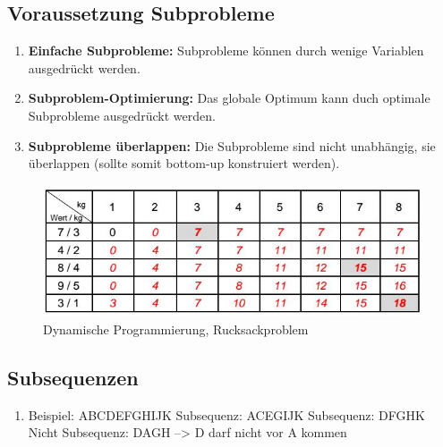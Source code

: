 \subsection{Voraussetzung Subprobleme}
\begin{enumerate}
	\item \textbf{Einfache Subprobleme:} Subprobleme können durch wenige Variablen ausgedrückt werden.
	\item \textbf{Subproblem-Optimierung:} Das globale Optimum kann duch optimale Subprobleme ausgedrückt werden.
	\item \textbf{Subprobleme überlappen:} Die Subprobleme sind nicht unabhängig, sie überlappen (sollte somit bottom-up konstruiert werden).
\end{enumerate}


\newpage

\begin{figure}[h]
\centering
\includegraphics[width=0.8\linewidth]{images/dynamische_prog}
\caption{Dynamische Programmierung, Rucksackproblem}
\label{fig:dynamischeprog}
\end{figure}

\subsection{Subsequenzen}
\begin{enumerate}
	\item Beispiel: ABCDEFGHIJK
	\subitem Subsequenz: ACEGIJK
	\subitem Subsequenz: DFGHK
	\subitem Nicht Subsequenz: DAGH --> D darf nicht vor A kommen
\end{enumerate}

